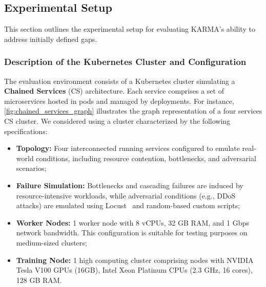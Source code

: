 
\subsection{Experimental Setup}
\label{sec:experiments}

This section outlines the experimental setup for evaluating KARMA's ability to address initially defined gaps.

\subsubsection{Description of the Kubernetes Cluster and Configuration}

The evaluation environment consists of a Kubernetes cluster simulating a \textbf{Chained Services} (CS) architecture. Each service comprises a set of microservices hosted in pods and managed by deployments. For instance, \autoref{fig:chained_services_graph} illustrates the graph representation of a four services CS cluster. We considered using a cluster characterized by the following specifications:

\begin{itemize}
    \item \textbf{Topology:} Four interconnected running services configured to emulate real-world conditions, including resource contention, bottlenecks, and adversarial scenarios;
    \item \textbf{Failure Simulation:} Bottlenecks and cascading failures are induced by resource-intensive workloads, while adversarial conditions (e.g., DDoS attacks) are emulated using Locust~\cite{locust2021} and random-based custom scripts;
    \item \textbf{Worker Nodes:} 1 worker node with 8 vCPUs, 32 GB RAM, and 1 Gbps network bandwidth. This configuration is suitable for testing purposes on medium-sized clusters;
    \item \textbf{Training Node:} 1 high computing cluster comprising nodes with NVIDIA Tesla V100 GPUs (16GB), Intel Xeon Platinum CPUs (2.3 GHz, 16 cores), 128 GB RAM.
\end{itemize}

